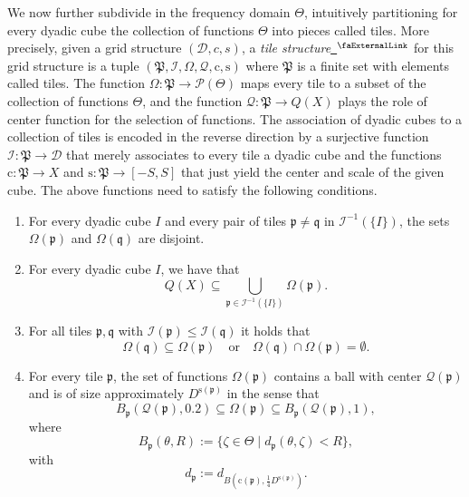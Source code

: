 \documentclass[12pt, reqno]{amsart}
\newcommand{\extlink}{~\ensuremath{{}^\text{\faExternalLink}}}
\theoremstyle{definition}
\theoremstyle{plain}
\newcommand{\pc}{{\mathrm{c}}}
\newcommand{\ps}{{\mathrm{s}}}
\newcommand{\fc}{{\Omega}}
\newcommand{\scI}{{\mathcal{I}}} %
\newcommand{\tQ}{{Q}}
\newcommand{\mfa}{{\theta}}
\newcommand{\mfb}{{\zeta}}
\newcommand{\Mf}{{\Theta}}
\newcommand{\fcc}{{\mathcal{Q}}}
\newcommand{\fp}{{\mathfrak p}}
\newcommand{\fP}{{\mathfrak P}}
\newcommand{\fq}{{\mathfrak q}}
\begin{document}
We now further subdivide in the frequency domain $\Theta$, intuitively partitioning for every dyadic cube the collection of functions $\Theta$ into pieces called tiles. More precisely, given a grid structure $(\mathcal{D}, c, s)$, a \emph{tile structure}\href{https://github.com/fpvandoorn/carleson/blob/AFM-frozen/Carleson/TileStructure.lean#L54-L65}{\extlink} for this grid structure is a tuple $(\fP,\scI,\fc,\fcc,\pc,\ps)$ where $\fP$ is a finite set with elements called tiles. The function $\fc\colon \fP \to \mathcal{P}(\Mf)$ maps every tile to a subset of the collection of functions $\Theta$, and the function $\fcc\colon \fP \to \tQ(X)$ plays the role of center function for the selection of functions. The association of dyadic cubes to a collection of tiles is encoded in the reverse direction by a surjective function $\scI: \fP \to \mathcal{D}$ that merely associates to every tile a dyadic cube and the functions $\pc\colon \fP \to X$ and $\ps\colon \fP \to [-S, S]$ that just yield the center and scale of the given cube. The above functions need to satisfy the following conditions.

\begin{enumerate}[label=\roman*.]
\item \label{it:omega-disjoint} For every dyadic cube $I$ and every pair of tiles $\fp \neq \fq$ in $\scI^{-1}(\{I\})$, the sets $\fc(\fp)$ and $\fc(\fq)$ are disjoint.
\item For every dyadic cube $I$, we have that
\begin{equation*}
    \tQ(X)\subseteq \bigcup_{\fp\in \scI^{-1}(\{I\})}\fc(\fp).
\end{equation*}
\item For all tiles $\fp, \fq$ with $\scI(\fp) \le \scI(\fq)$ it holds that
\begin{equation*}
    \fc(\fq)\subseteq \fc(\fp) \quad\text{or}\quad \fc(\fq)\cap \fc(\fp) = \emptyset.
\end{equation*}
\item For every tile $\fp$, the set of functions $\fc(\fp)$ contains a ball with center $\fcc(\fp)$ and is of size approximately $D^{\ps(\fp)}$ in the sense that
\begin{equation*}
    B_{\fp}(\fcc(\fp), 0.2) \subseteq \fc(\fp) \subseteq B_{\fp}(\fcc(\fp),1),
\end{equation*}
where
\begin{equation*}
    B_{\fp} (\mfa, R) := \{\mfb \in \Mf \mid d_{\fp}(\mfa, \mfb) < R\},
\end{equation*}
with
\begin{equation*}
    d_{\fp} := d_{B(\pc(\fp),\frac 14 D^{\ps(\fp)})}.
\end{equation*}
\end{enumerate}
\end{document}
